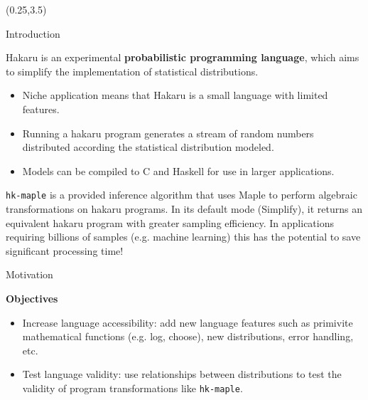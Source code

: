 \documentclass[22pt]{beamer}
\begin{document}
\begin{frame}[fragile]
\begin{textblock}{5}(0.25,3.5)


\begin{block}{\Large{Introduction}}
\justifying

\footnotesize{Hakaru is an experimental \textbf{probabilistic programming language}, which aims to simplify the implementation of statistical distributions. 

\begin{itemize}
    \item Niche application means that Hakaru is a small language with limited features.
    \item Running a hakaru program generates a stream of random numbers distributed according the statistical distribution modeled.
    \item Models can be compiled to C and Haskell for use in larger applications.
\end{itemize}

}

\bigskip
\footnotesize{{\tt \footnotesize{hk-maple}} is a provided inference algorithm that uses Maple to perform algebraic transformations on hakaru programs. In its default mode (Simplify), it returns an equivalent hakaru program with greater sampling efficiency. In applications requiring billions of samples (e.g. machine learning) this has the potential to save significant processing time!}

\end{block}


\begin{block}{\Large{Motivation}}
\justifying


\normalsize{\textbf{Objectives}}

\footnotesize{
\begin{itemize}
  \item Increase language accessibility: add new language features such as primivite mathematical functions (e.g. log, choose), new distributions, error handling, etc.
  \item Test language validity: use relationships between distributions to test the validity of program transformations like {\tt \footnotesize{hk-maple}}. 
\end{itemize}
}


\end{block}
\end{textblock}
\end{frame}
\end{document}
